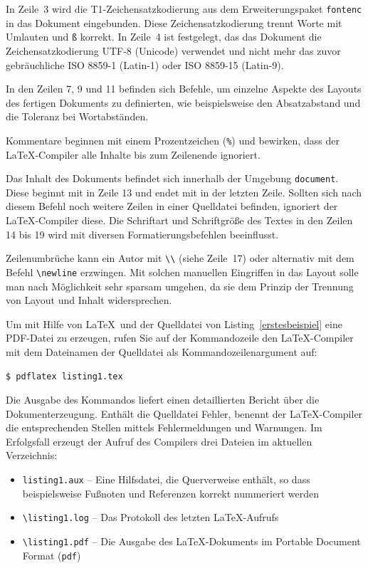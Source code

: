 In Zeile~3 wird die T1-Zeichensatzkodierung aus dem Erweiterungspaket \verb!fontenc! in das Dokument eingebunden. Diese Zeichensatzkodierung trennt Worte mit Umlauten und \verb!ß! korrekt. In Zeile~4 ist festgelegt, das das Dokument die Zeichensatzkodierung UTF-8 (Unicode) verwendet und nicht mehr das zuvor gebräuchliche ISO 8859-1 (Latin-1) oder ISO 8859-15 (Latin-9). 

In den Zeilen 7, 9 und 11 befinden sich Befehle, um einzelne Aspekte des Layouts des fertigen Dokuments zu definierten, wie beispielsweise den Absatzabstand und die Toleranz bei Wortabständen. 

Kommentare beginnen mit einem Prozentzeichen (\verb!%!) und bewirken, dass der LaTeX-Compiler alle Inhalte bis zum Zeilenende ignoriert.

Das Inhalt des Dokuments befindet sich innerhalb der Umgebung \verb!document!. Diese beginnt mit \verb!! in Zeile 13 und endet mit \verb!! in der letzten Zeile. Sollten sich nach diesem Befehl noch weitere Zeilen in einer Quelldatei befinden, ignoriert der \LaTeX-Compiler diese. Die Schriftart und Schriftgröße des Textes in den Zeilen 14 bis 19 wird mit diversen Formatierungsbefehlen beeinflusst. 

Zeilenumbrüche kann ein Autor mit \verb!\\! (siehe Zeile~17) oder alternativ mit dem Befehl \verb!\newline! erzwingen. Mit solchen manuellen Eingriffen in das Layout solle man nach Möglichkeit sehr sparsam umgehen, da sie dem Prinzip der Trennung von Layout und Inhalt widersprechen. 

Um mit Hilfe von \LaTeX\ und der Quelldatei von Listing~\ref{erstesbeispiel} eine PDF-Datei zu erzeugen, rufen Sie auf der Kommandozeile den \LaTeX-Compiler mit dem Dateinamen der Quelldatei als Kommandozeilenargument auf:

\begin{Verbatim}[frame=single]
$ pdflatex listing1.tex
\end{Verbatim}

Die Ausgabe des Kommandos liefert einen detaillierten Bericht über die Dokumenterzeugung. Enthält die Quelldatei Fehler, benennt der \LaTeX-Compiler die entsprechenden Stellen mittels Fehlermeldungen und Warnungen. Im Erfolgsfall erzeugt der Aufruf des Compilers drei Dateien im aktuellen Verzeichnis:

\begin{itemize}
\item \verb!listing1.aux! -- Eine Hilfsdatei, die Querverweise enthält, so dass beispielsweise Fußnoten und Referenzen korrekt nummeriert werden
\item \verb!\listing1.log! -- Das Protokoll des letzten \LaTeX-Aufrufs
\item \verb!\listing1.pdf! -- Die Ausgabe des \LaTeX-Dokuments im Portable Document Format (\verb!pdf!)
\end{itemize}

